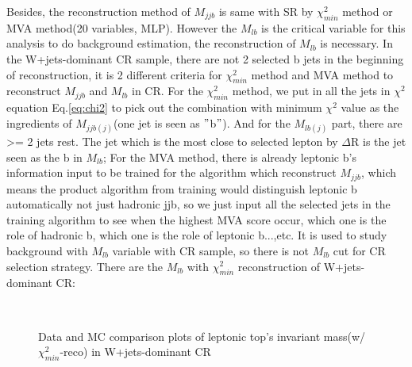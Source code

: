 		Besides, the reconstruction method of $M_{jjb}$ is same with SR by $\chi^2_{min}$ method or MVA method(20 variables, MLP). However the $M_{lb}$ is the critical variable for this analysis to do background estimation, the reconstruction of $M_{lb}$ is necessary. In the W+jets-dominant CR sample, there are not 2 selected b jets in the beginning of reconstruction, it is 2 different criteria for $\chi^2_{min}$ method and MVA method to reconstruct $M_{jjb}$ and $M_{lb}$ in CR. For the $\chi^2_{min}$ method, we put in all the jets in $\chi^2$ equation Eq.\ref{eq:chi2} to pick out the combination with minimum $\chi^2$ value as the ingredients of $M_{jjb(j)}$(one jet is seen as $"$b$"$). And for the $M_{lb(j)}$ part, there are >= 2 jets rest. The jet which is the most close to selected lepton by $\Delta$R is the jet seen as the b in $M_{lb}$; For the MVA method, there is already leptonic b's information input to be trained for the algorithm which reconstruct $M_{jjb}$, which means the product algorithm from training would distinguish leptonic b automatically not just hadronic jjb, so we just input all the selected jets in the training algorithm to see when the highest MVA score occur, which one is the role of hadronic b, which one is the role of leptonic b...,etc. It is used to study background with $M_{lb}$ variable with CR sample, so there is not $M_{lb}$ cut for CR selection strategy. There are the $M_{lb}$ with $\chi^2_{min}$ reconstruction of W+jets-dominant CR:

		\begin{figure}[H]
		\centering
			\\
		\caption{Data and MC comparison plots of leptonic top's invariant mass(w/ $\chi^2_{min}$-reco) in W+jets-dominant CR}
		\label{EventSelReco:fig:chi2_CR1_1C_Mlb_nDD}
		\end{figure}
		\FloatBarrier

